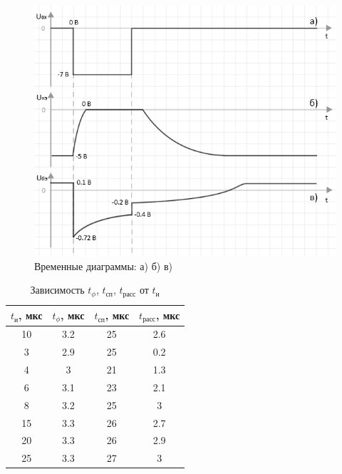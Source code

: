 \begin{figure}[H]
	\begin{center}
		\includegraphics[width=16cm]{img/time}
		\caption{Временные диаграммы: а) б) в)}
		\label{p:2} %
	\end{center}
\end{figure}

\begin{table}[H]
	\begin{center}
	\caption{Зависимость $t_\phi$, $t_\text{сп}$, $t_\text{расс}$ от $t_\text{и}$}
		\begin{tabular}{|c|c|c|c|}
		\hline 
		$t_\text{и}$, мкс & $t_\phi$, мкс & $t_\text{сп}$, мкс & $t_\text{расс}$, мкс \\ 
		\hline 
		10 & 3.2 & 25 & 2.6 \\ 
		\hline 
		3 & 2.9 & 25 & 0.2 \\ 
		\hline 
		4 & 3 & 21 & 1.3 \\ 
		\hline 
		6 & 3.1 & 23 & 2.1 \\ 
		\hline 
		8 & 3.2 & 25 & 3 \\ 
		\hline 
		15 & 3.3 & 26 & 2.7 \\ 
		\hline 
		20 & 3.3 & 26 & 2.9 \\ 
		\hline 
		25 & 3.3 & 27 & 3 \\ 
		\hline 
		\end{tabular} 
		\label{tabular:2}
	\end{center}
\end{table}

